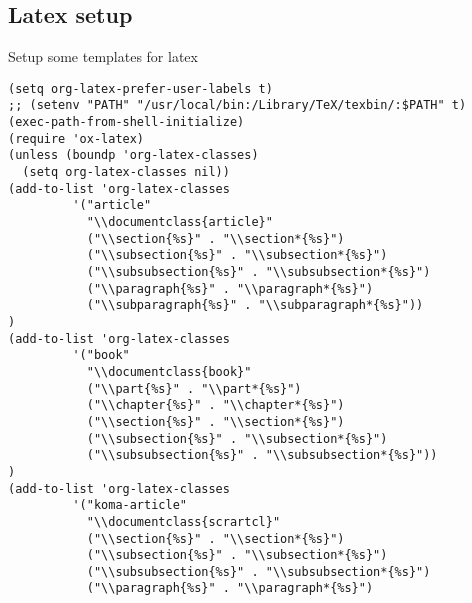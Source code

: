 \documentclass[11pt]{article}
\begin{document}
\subsection{Latex setup}
\label{sec:org5200ce6}
Setup some templates for latex
\begin{verbatim}
(setq org-latex-prefer-user-labels t)
;; (setenv "PATH" "/usr/local/bin:/Library/TeX/texbin/:$PATH" t)
(exec-path-from-shell-initialize)
(require 'ox-latex)
(unless (boundp 'org-latex-classes)
  (setq org-latex-classes nil))
(add-to-list 'org-latex-classes
	     '("article"
	       "\\documentclass{article}"
	       ("\\section{%s}" . "\\section*{%s}")
	       ("\\subsection{%s}" . "\\subsection*{%s}")
	       ("\\subsubsection{%s}" . "\\subsubsection*{%s}")
	       ("\\paragraph{%s}" . "\\paragraph*{%s}")
	       ("\\subparagraph{%s}" . "\\subparagraph*{%s}"))
)
(add-to-list 'org-latex-classes
	     '("book"
	       "\\documentclass{book}"
	       ("\\part{%s}" . "\\part*{%s}")
	       ("\\chapter{%s}" . "\\chapter*{%s}")
	       ("\\section{%s}" . "\\section*{%s}")
	       ("\\subsection{%s}" . "\\subsection*{%s}")
	       ("\\subsubsection{%s}" . "\\subsubsection*{%s}"))
)
(add-to-list 'org-latex-classes
	     '("koma-article"
	       "\\documentclass{scrartcl}"
	       ("\\section{%s}" . "\\section*{%s}")
	       ("\\subsection{%s}" . "\\subsection*{%s}")
	       ("\\subsubsection{%s}" . "\\subsubsection*{%s}")
	       ("\\paragraph{%s}" . "\\paragraph*{%s}")

\end{verbatim}
\end{document}
